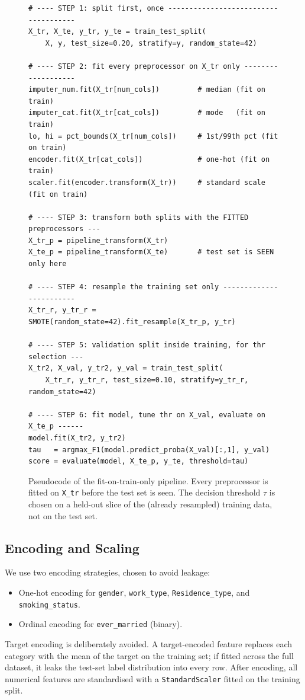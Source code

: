 \documentclass[pdflatex,sn-basic,Numbered]{sn-jnl}
\theoremstyle{thmstyleone}
\theoremstyle{thmstyletwo}
\theoremstyle{thmstylethree}
\begin{document}
\begin{figure}[!htbp]
\centering
\begin{minipage}{0.95\textwidth}
\small
\begin{verbatim}
# ---- STEP 1: split first, once -------------------------------------
X_tr, X_te, y_tr, y_te = train_test_split(
    X, y, test_size=0.20, stratify=y, random_state=42)

# ---- STEP 2: fit every preprocessor on X_tr only -------------------
imputer_num.fit(X_tr[num_cols])         # median (fit on train)
imputer_cat.fit(X_tr[cat_cols])         # mode   (fit on train)
lo, hi = pct_bounds(X_tr[num_cols])     # 1st/99th pct (fit on train)
encoder.fit(X_tr[cat_cols])             # one-hot (fit on train)
scaler.fit(encoder.transform(X_tr))     # standard scale (fit on train)

# ---- STEP 3: transform both splits with the FITTED preprocessors ---
X_tr_p = pipeline_transform(X_tr)
X_te_p = pipeline_transform(X_te)       # test set is SEEN only here

# ---- STEP 4: resample the training set only ------------------------
X_tr_r, y_tr_r = SMOTE(random_state=42).fit_resample(X_tr_p, y_tr)

# ---- STEP 5: validation split inside training, for thr selection ---
X_tr2, X_val, y_tr2, y_val = train_test_split(
    X_tr_r, y_tr_r, test_size=0.10, stratify=y_tr_r, random_state=42)

# ---- STEP 6: fit model, tune thr on X_val, evaluate on X_te_p ------
model.fit(X_tr2, y_tr2)
tau   = argmax_F1(model.predict_proba(X_val)[:,1], y_val)
score = evaluate(model, X_te_p, y_te, threshold=tau)
\end{verbatim}
\end{minipage}
\caption{Pseudocode of the fit-on-train-only pipeline. Every preprocessor
is fitted on \texttt{X\_tr} before the test set is seen. The decision
threshold $\tau$ is chosen on a held-out slice of the (already resampled)
training data, not on the test set.}
\label{fig:pseudocode}
\end{figure}

\subsection{Encoding and Scaling}
We use two encoding strategies, chosen to avoid leakage:
\begin{itemize}
\item One-hot encoding for \texttt{gender}, \texttt{work\_type},
\texttt{Residence\_type}, and \texttt{smoking\_status}.
\item Ordinal encoding for \texttt{ever\_married} (binary).
\end{itemize}
Target encoding is deliberately avoided. A target-encoded feature replaces
each category with the mean of the target on the training set; if fitted
across the full dataset, it leaks the test-set label distribution into every
row. After encoding, all numerical features are standardised with a
\texttt{StandardScaler} fitted on the training split.
\end{document}
